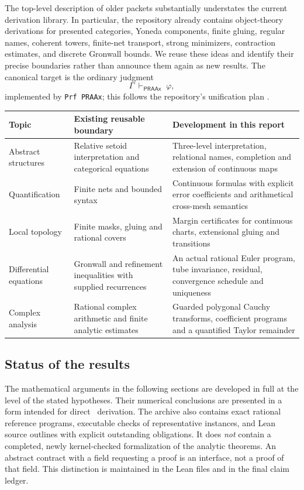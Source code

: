 The top-level description of older packets substantially understates the current
derivation library. In particular, the repository already contains object-theory
derivations for presented categories, Yoneda components, finite gluing, regular
names, coherent towers, finite-net transport, strong minimizers, contraction
estimates, and discrete Gronwall bounds. We reuse these ideas and identify their
precise boundaries rather than announce them again as new results. The canonical
target is the ordinary judgment
\[
       \Gamma\;\vdash_{\mathsf{PRAAx}}\;\varphi,
\]
implemented by \texttt{Prf PRAAx}; this follows the repository's unification
plan \cite{repo-plan,repo-pr,repo-setoid}.

\begin{center}\small
\begin{tabularx}{\linewidth}{@{}p{.22\linewidth}XX@{}}
\toprule
Topic & Existing reusable boundary & Development in this report\\
\midrule
Abstract structures & Relative setoid interpretation and categorical equations &
Three-level interpretation, relational names, completion and extension of continuous maps\\
Quantification & Finite nets and bounded syntax &
Continuous formulas with explicit error coefficients and arithmetical cross-mesh semantics\\
Local topology & Finite masks, gluing and rational covers &
Margin certificates for continuous charts, extensional gluing and transitions\\
Differential equations & Gronwall and refinement inequalities with supplied recurrences &
An actual rational Euler program, tube invariance, residual, convergence schedule and uniqueness\\
Complex analysis & Rational complex arithmetic and finite analytic estimates &
Guarded polygonal Cauchy transforms, coefficient programs and a quantified Taylor remainder\\
\bottomrule
\end{tabularx}
\end{center}

\subsection{Status of the results}

The mathematical arguments in the following sections are developed in full at
the level of the stated hypotheses. Their numerical conclusions are presented in
a form intended for direct \ipra\ derivation. The archive also contains exact
rational reference programs, executable checks of representative instances, and
Lean source outlines with explicit outstanding obligations. It does \emph{not}
contain a completed, newly kernel-checked formalization of the analytic theorems.
An abstract contract with a field requesting a proof is an interface, not a
proof of that field. This distinction is maintained in the Lean files and in
the final claim ledger.

